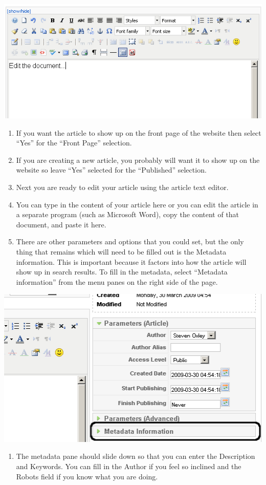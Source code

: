 \documentclass[letterpaper,10pt,english]{manual}
\begin{document}
{\hfill\includegraphics{articleEditor1.png}\hfill}
\begin{enumerate}
\item {} 
If you want the article to show up on the front page of the website then select “Yes” for the “Front Page” selection.

\item {} 
If you are creating a new article, you probably will want it to show up on the website so leave “Yes” selected for the “Published” selection.

\item {} 
Next you are ready to edit your article using the article text editor.

\item {} 
You can type in the content of your article here or you can edit the article in a separate program (such as Microsoft Word), copy the content of that document, and paste it here.

\item {} 
There are other parameters and options that you could set, but the only thing that remains which will need to be filled out is the Metadata information.  This is important because it factors into how the article will show up in search results.  To fill in the metadata, select “Metadata information” from the menu panes on the right side of the page.

\end{enumerate}

{\hfill\includegraphics{articleMetaDataSelection1.png}\hfill}
\begin{enumerate}
\item {} 
The metadata pane should slide down so that you can enter the Description and Keywords.  You can fill in the Author if you feel so inclined and the Robots field if you know what you are doing.

\end{enumerate}
\end{document}
